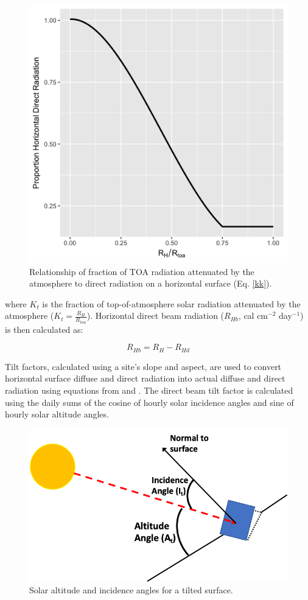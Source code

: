 \documentclass[a4paper, 12pt] {report}
\begin{document}
\begin{figure}
  \includegraphics[width=0.55\linewidth]{Figures/Keith_Kreider.png}
  \caption{Relationship of fraction of TOA radiation attenuated by the atmosphere to direct radiation on a horizontal surface \protect\cite{keithPrinciplesSolarEngineering1978} (Eq. \ref{kk}).}
  \label{fig:KK}
\end{figure}

where $K_t$ is the fraction of top-of-atmosphere solar radiation attenuated by the atmosphere ($K_t = \frac{R_H}{R_{toa}}$). Horizontal direct beam radiation ($R_{Hb}$, cal cm$^{-2}$ day$^{-1}$) is then calculated as:

\begin{equation}
R_{Hb} = R_H - R_{Hd}
\end{equation}

Tilt factors, calculated using a site's slope and aspect, are used to convert horizontal surface diffuse and direct radiation into actual diffuse and direct radiation using equations from  and . The direct beam tilt factor is calculated using the daily sums of the cosine of hourly solar incidence angles and sine of hourly solar altitude angles. 

\begin{figure}
  \includegraphics[width=0.6\linewidth]{Figures/Azimuth_Incidence.png}
  \caption{Solar altitude and incidence angles for a tilted surface.}
  \label{fig:aziinc}
\end{figure}
\end{document}
